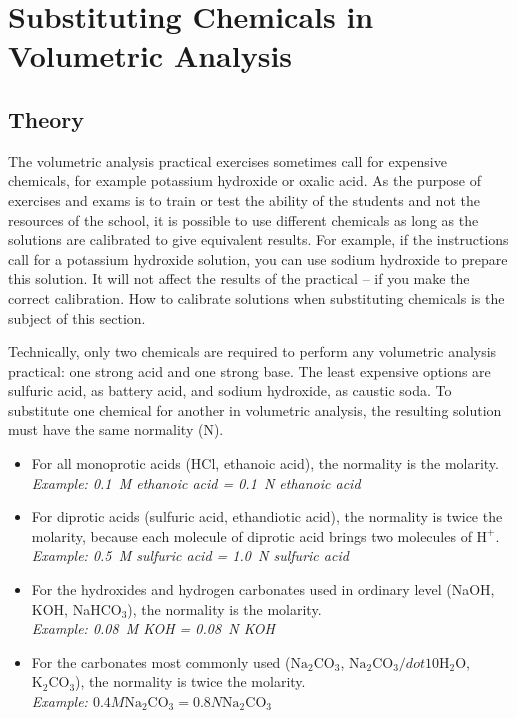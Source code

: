 \chapter{Substituting Chemicals in Volumetric Analysis}
\label{cha:subchemvolana}
\section{Theory}

The volumetric analysis practical exercises sometimes call for expensive chemicals, for example potassium hydroxide or oxalic acid. As the purpose of exercises and exams is to train or test the ability of the students and not the resources of the school, it is possible to use different chemicals as long as the solutions are calibrated to give equivalent results. For example, if the instructions call for a potassium hydroxide solution, you can use sodium hydroxide to prepare this solution. It will not affect the results of the practical -- if you make the correct calibration. How to calibrate solutions when substituting chemicals is the subject of this section.

Technically, only two chemicals are required to perform any volumetric analysis practical: one strong acid and one strong base. The least expensive options are sulfuric acid, as battery acid, and sodium hydroxide, as caustic soda. To substitute one chemical for another in volumetric analysis, the resulting solution must have the same normality (N).

\begin{itemize}

\item{For all monoprotic acids (HCl, ethanoic acid), the normality is the molarity.\\
\textit{Example: 0.1~M ethanoic acid = 0.1~N ethanoic acid}}
\item{For diprotic acids (sulfuric acid, ethandiotic acid), the normality is twice the molarity, because each molecule of diprotic acid brings two molecules of $\mathrm{H}^{+}$.\\
\textit{Example: 0.5~M sulfuric acid = 1.0~N sulfuric acid}}
\item{For the hydroxides and hydrogen carbonates used in ordinary level (NaOH, KOH, NaHCO$_{3}$), the normality is the molarity.\\
\textit{Example: 0.08~M KOH = 0.08~N KOH}}
\item{For the carbonates most commonly used ($\mathrm{Na}_2\mathrm{CO}_3$, $\mathrm{Na}_2\mathrm{CO}_3 /dot 10\mathrm{H}_2\mathrm{O}$, $\mathrm{K}_2\mathrm{CO}_3$), the normality is twice the molarity.\\
\textit{Example: $0.4 M \mathrm{Na}_2\mathrm{CO}_3 = 0.8 N \mathrm{Na}_2\mathrm{CO}_3$}}

\end{itemize}

